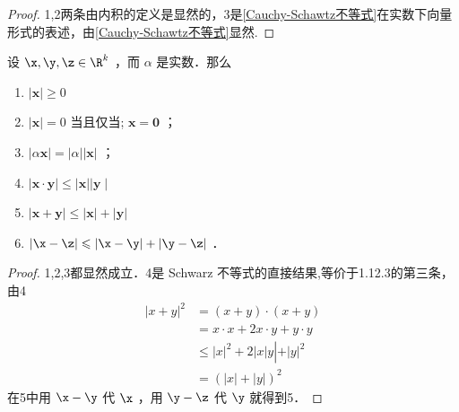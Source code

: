 \begin{proof}
	1,2两条由内积的定义是显然的，3是\ref{Cauchy-Schawtz不等式}在实数下向量形式的表述，由\ref{Cauchy-Schawtz不等式}显然.
\end{proof}
\begin{proposition}设 $\x, \y, \z \in \R^k$ ，而 $\alpha$ 是实数．那么
	\begin{enumerate}
		\item$|\boldsymbol{x}| \geqslant 0$ 
		\item$|\boldsymbol{x}|=0$ 当且仅当; $\boldsymbol{x}=\mathbf{0}$ ；
		\item$|\alpha \boldsymbol{x}|=|\alpha||\boldsymbol{x}|$ ；
		\item$|\boldsymbol{x} \cdot \boldsymbol{y}| \leqslant|\boldsymbol{x}|| \boldsymbol{y} \mid$
		\item$|\boldsymbol{x}+\boldsymbol{y}| \leqslant|\boldsymbol{x}|+|\boldsymbol{y}|$
		\item$|\x-\z| \leqslant|\x-\y|+|\y-\z|$ ．
	\end{enumerate}
\end{proposition}
\begin{proof}
	1,2,3都显然成立．4是 Schwarz 不等式的直接结果,等价于1.12.3的第三条，由4
	$$
	\begin{aligned}
		|x+y|^2 & =(x+y) \cdot(x+y) \\
		& =x \cdot x+2 x \cdot y+y \cdot y \\
		& \leqslant|x|^2+2|x| y\left|+|y|^2\right. \\
		& =(|x|+|y|)^2
	\end{aligned}
	$$
	在5中用 $\x-\y$ 代 $\x$ ，用 $\y-\z$ 代 $\y$ 就得到5．
	
	
\end{proof}
